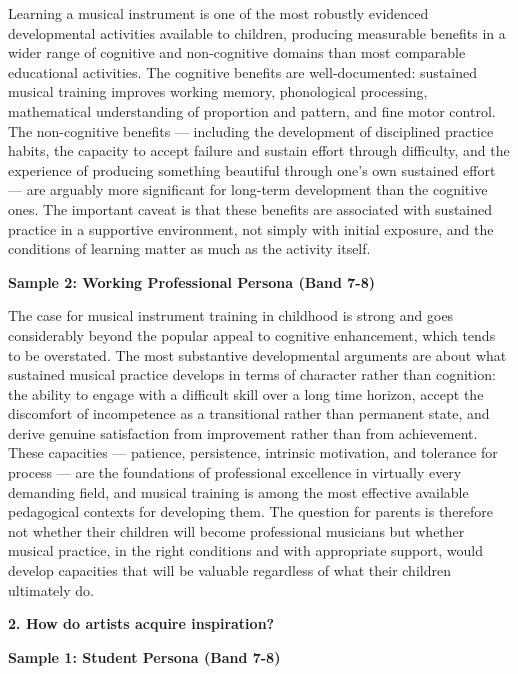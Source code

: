 Learning a musical instrument is one of the most robustly evidenced developmental activities available to children, producing measurable benefits in a wider range of cognitive and non-cognitive domains than most comparable educational activities. The cognitive benefits are well-documented: sustained musical training improves working memory, phonological processing, mathematical understanding of proportion and pattern, and fine motor control. The non-cognitive benefits — including the development of disciplined practice habits, the capacity to accept failure and sustain effort through difficulty, and the experience of producing something beautiful through one's own sustained effort — are arguably more significant for long-term development than the cognitive ones. The important caveat is that these benefits are associated with sustained practice in a supportive environment, not simply with initial exposure, and the conditions of learning matter as much as the activity itself.

\textbf{Sample 2: Working Professional Persona (Band 7-8)}

The case for musical instrument training in childhood is strong and goes considerably beyond the popular appeal to cognitive enhancement, which tends to be overstated. The most substantive developmental arguments are about what sustained musical practice develops in terms of character rather than cognition: the ability to engage with a difficult skill over a long time horizon, accept the discomfort of incompetence as a transitional rather than permanent state, and derive genuine satisfaction from improvement rather than from achievement. These capacities — patience, persistence, intrinsic motivation, and tolerance for process — are the foundations of professional excellence in virtually every demanding field, and musical training is among the most effective available pedagogical contexts for developing them. The question for parents is therefore not whether their children will become professional musicians but whether musical practice, in the right conditions and with appropriate support, would develop capacities that will be valuable regardless of what their children ultimately do.

\separator

\begin{ieltsquestion}
\textbf{2. How do artists acquire inspiration?}
\end{ieltsquestion}
\textbf{Sample 1: Student Persona (Band 7-8)}

